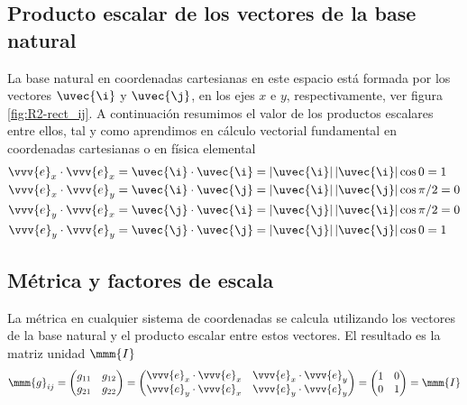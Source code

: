 \subsection{Producto escalar de los vectores de la base natural}
La base natural en coordenadas cartesianas en este espacio está formada por los vectores
$\uvec{\i}$ y $\uvec{\j}$, en los ejes $x$ e $y$, respectivamente, ver figura
\ref{fig:R2-rect_ij}.
A continuación resumimos el valor de los productos escalares entre ellos, tal y como
aprendimos en cálculo vectorial fundamental en coordenadas cartesianas o en física
elemental
\begin{subequations}
  \begin{align}
    \label{eq:R2-cart-ii_prod_escalar}
    \vvv{e}_x\cdot\vvv{e}_x = \uvec{\i}\cdot\uvec{\i}
    &= |\uvec{\i}|\,|\uvec{\i}|\cos 0 = 1\\
    \label{eq:R2-cart-ij_prod_escalar}    
    \vvv{e}_x\cdot\vvv{e}_y = \uvec{\i}\cdot\uvec{\j}
    &= |\uvec{\i}|\,|\uvec{\j}|\cos\pi/2 = 0\\
    \label{eq:R2-cart-ji_prod_escalar} 
    \vvv{e}_y\cdot\vvv{e}_x = \uvec{\j}\cdot\uvec{\i}
    &= |\uvec{\j}|\,|\uvec{\i}|\cos\pi/2 = 0\\
    \label{eq:R2-cart-jj_prod_escalar}
    \vvv{e}_y\cdot\vvv{e}_y = \uvec{\j}\cdot\uvec{\j}
    &= |\uvec{\j}|\,|\uvec{\j}|\cos 0 = 1
  \end{align}
\end{subequations}

\subsection{Métrica y factores de escala}
La métrica en cualquier sistema de coordenadas se calcula utilizando los vectores de la
base natural y el producto escalar entre estos vectores. El resultado es la matriz
unidad $\mmm{I}$
\begin{equation}\label{eq:R2-cart-metrica}
  \mmm{g}_{ij}
  = \begin{pmatrix}
    g_{11} & g_{12}\\
    g_{21} & g_{22}
    \end{pmatrix}
  = \begin{pmatrix}
      \vvv{e}_x\cdot\vvv{e}_x & \vvv{e}_x\cdot\vvv{e}_y\\
      \vvv{e}_y\cdot\vvv{e}_x & \vvv{e}_y\cdot\vvv{e}_y
  \end{pmatrix}
  = \begin{pmatrix}
    1 & 0\\
    0 & 1
  \end{pmatrix}
  = \mmm{I}
\end{equation}

